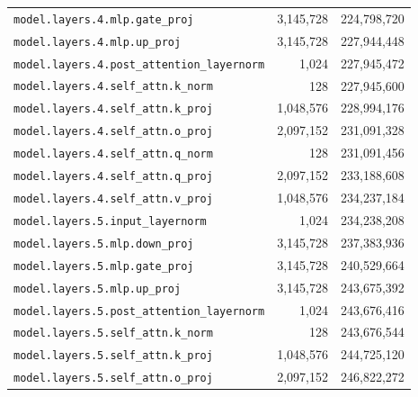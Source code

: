 \documentclass[10pt,a4paper]{article}
\theoremstyle{definition}
\begin{document}
\begin{appendices}
\begin{longtable}{p{9.5cm}rr}
\texttt{model.\allowbreak{}layers.\allowbreak{}4.\allowbreak{}mlp.\allowbreak{}gate\_proj} & 3,145,728 & 224,798,720 \\
\texttt{model.\allowbreak{}layers.\allowbreak{}4.\allowbreak{}mlp.\allowbreak{}up\_proj} & 3,145,728 & 227,944,448 \\
\texttt{model.\allowbreak{}layers.\allowbreak{}4.\allowbreak{}post\_attention\_layernorm} & 1,024 & 227,945,472 \\
\texttt{model.\allowbreak{}layers.\allowbreak{}4.\allowbreak{}self\_attn.\allowbreak{}k\_norm} & 128 & 227,945,600 \\
\texttt{model.\allowbreak{}layers.\allowbreak{}4.\allowbreak{}self\_attn.\allowbreak{}k\_proj} & 1,048,576 & 228,994,176 \\
\texttt{model.\allowbreak{}layers.\allowbreak{}4.\allowbreak{}self\_attn.\allowbreak{}o\_proj} & 2,097,152 & 231,091,328 \\
\texttt{model.\allowbreak{}layers.\allowbreak{}4.\allowbreak{}self\_attn.\allowbreak{}q\_norm} & 128 & 231,091,456 \\
\texttt{model.\allowbreak{}layers.\allowbreak{}4.\allowbreak{}self\_attn.\allowbreak{}q\_proj} & 2,097,152 & 233,188,608 \\
\texttt{model.\allowbreak{}layers.\allowbreak{}4.\allowbreak{}self\_attn.\allowbreak{}v\_proj} & 1,048,576 & 234,237,184 \\
\texttt{model.\allowbreak{}layers.\allowbreak{}5.\allowbreak{}input\_layernorm} & 1,024 & 234,238,208 \\
\texttt{model.\allowbreak{}layers.\allowbreak{}5.\allowbreak{}mlp.\allowbreak{}down\_proj} & 3,145,728 & 237,383,936 \\
\texttt{model.\allowbreak{}layers.\allowbreak{}5.\allowbreak{}mlp.\allowbreak{}gate\_proj} & 3,145,728 & 240,529,664 \\
\texttt{model.\allowbreak{}layers.\allowbreak{}5.\allowbreak{}mlp.\allowbreak{}up\_proj} & 3,145,728 & 243,675,392 \\
\texttt{model.\allowbreak{}layers.\allowbreak{}5.\allowbreak{}post\_attention\_layernorm} & 1,024 & 243,676,416 \\
\texttt{model.\allowbreak{}layers.\allowbreak{}5.\allowbreak{}self\_attn.\allowbreak{}k\_norm} & 128 & 243,676,544 \\
\texttt{model.\allowbreak{}layers.\allowbreak{}5.\allowbreak{}self\_attn.\allowbreak{}k\_proj} & 1,048,576 & 244,725,120 \\
\texttt{model.\allowbreak{}layers.\allowbreak{}5.\allowbreak{}self\_attn.\allowbreak{}o\_proj} & 2,097,152 & 246,822,272 \\

\end{longtable}
\end{appendices}
\end{document}
